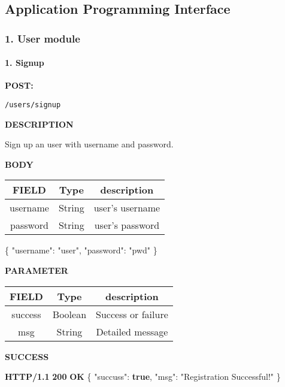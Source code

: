 \documentclass[
]{article}
\newenvironment{Shaded}{}{}
\newcommand{\DataTypeTok}[1]{\textcolor[rgb]{0.56,0.13,0.00}{#1}}
\newcommand{\ErrorTok}[1]{\textcolor[rgb]{1.00,0.00,0.00}{\textbf{#1}}}
\newcommand{\FunctionTok}[1]{\textcolor[rgb]{0.02,0.16,0.49}{#1}}
\newcommand{\KeywordTok}[1]{\textcolor[rgb]{0.00,0.44,0.13}{\textbf{#1}}}
\newcommand{\StringTok}[1]{\textcolor[rgb]{0.25,0.44,0.63}{#1}}
\begin{document}
\hypertarget{header-n19}{%
\subsection{Application Programming Interface}\label{header-n19}}

\hypertarget{header-n20}{%
\subsubsection{1. User module}\label{header-n20}}

\hypertarget{header-n21}{%
\paragraph{1. Signup}\label{header-n21}}

\textbf{POST:}

\begin{verbatim}
/users/signup
\end{verbatim}

\textbf{DESCRIPTION}

Sign up an user with username and password.

\textbf{BODY}

\begin{longtable}[]{@{}ccc@{}}
\toprule
FIELD & Type & description\tabularnewline
\midrule
\endhead
username & String & user's username\tabularnewline
password & String & user's password\tabularnewline
\bottomrule
\end{longtable}

\begin{Shaded}
\begin{Highlighting}[]
\FunctionTok{\{}
    \DataTypeTok{"username"}\FunctionTok{:} \StringTok{"user"}\FunctionTok{,}
    \DataTypeTok{"password"}\FunctionTok{:} \StringTok{"pwd"}
\FunctionTok{\}}
\end{Highlighting}
\end{Shaded}

\textbf{PARAMETER}

\begin{longtable}[]{@{}ccc@{}}
\toprule
FIELD & Type & description\tabularnewline
\midrule
\endhead
success & Boolean & Success or failure\tabularnewline
msg & String & Detailed message\tabularnewline
\bottomrule
\end{longtable}

\textbf{SUCCESS}

\begin{Shaded}
\begin{Highlighting}[]
\ErrorTok{HTTP/1.1} \ErrorTok{200} \ErrorTok{OK}
\FunctionTok{\{}
    \DataTypeTok{"succuss"}\FunctionTok{:} \KeywordTok{true}\FunctionTok{,}
    \DataTypeTok{"msg"}\FunctionTok{:} \StringTok{"Registration Successful!"}
\FunctionTok{\}}
\end{Highlighting}
\end{Shaded}
\end{document}
